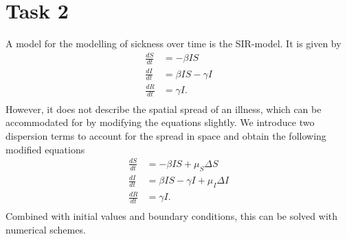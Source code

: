 \section{Task 2}

A model for the modelling of sickness over time is the SIR-model. It is given by
\begin{equation}
    \begin{split}
        \frac{dS}{dt} &= -\beta I S \\
        \frac{dI}{dt} &= \beta IS - \gamma I \\
        \frac{dR}{dt} &= \gamma I. \\
    \end{split}
\end{equation}
However, it does not describe the spatial spread of an illness, which can be accommodated for by modifying the equations slightly. We introduce
two dispersion terms to account for the spread in space and obtain the following modified equations
\begin{equation}
    \begin{split}
        \frac{dS}{dt} &= -\beta I S + \mu_S \Delta S \\
        \frac{dI}{dt} &= \beta IS - \gamma I + \mu_I \Delta I\\
        \frac{dR}{dt} &= \gamma I. \\
    \end{split}
\end{equation}
Combined with initial values and boundary conditions, this can be solved with numerical schemes.

